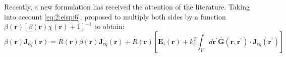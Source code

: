 		
		
		
			Recently, a new formulation has received the attention of the literature. Taking into account \eqref{eq:2:eisp:6}, \cite{zhong2016new} proposed to multiply both sides by a function $\beta(\mathbf{r})\left[\beta(\mathbf{r})\chi(\mathbf{r})+1\right]^{-1}$ to obtain:
			\begin{equation}
				\beta(\mathbf{r})\mathbf{J}_{eq}(\mathbf{r}) = R(\mathbf{r})\beta(\mathbf{r})\mathbf{J}_{eq}(\mathbf{r})+R(\mathbf{r})\left[\mathbf{E}_i(\mathbf{r}) + k_b^2\int_Vd\mathbf{r^\prime} \mathbf{\bar{G}}(\mathbf{r},\mathbf{r^\prime})\cdot\mathbf{J}_{eq}(\mathbf{r^\prime})\right] \label{eq:2:eisp:9}
			\end{equation} 
			
